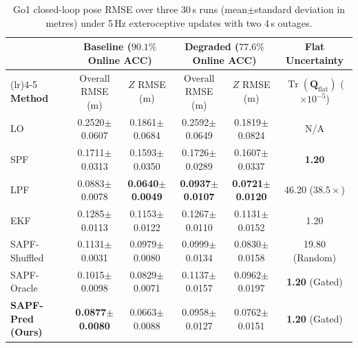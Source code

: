 \documentclass[11pt, a4paper]{article}
\begin{document}
\begin{table}[htbp]
    \centering
    \caption{Go1 closed-loop pose RMSE over three 30\,s runs (mean$\pm$standard deviation in metres) under 5\,Hz exteroceptive updates with two 4\,s outages.}
    \label{tab:go1_sapf}
    \footnotesize
    \setlength{\tabcolsep}{3.5pt}
    \begin{tabularx}{\textwidth}{>{\raggedright\arraybackslash}X ccccc}
        \toprule
        & \multicolumn{2}{c}{\textbf{Baseline ($90.1\%$ Online ACC)}} & \multicolumn{2}{c}{\textbf{Degraded ($77.6\%$ Online ACC)}} & \textbf{Flat Uncertainty} \\
        \cmidrule(lr){2-3}\cmidrule(lr){4-5}
        \textbf{Method} & Overall RMSE (m) & $Z$ RMSE (m) & Overall RMSE (m) & $Z$ RMSE (m) & $\operatorname{Tr}(\mathbf{Q}_{\text{flat}})$ ($\times 10^{-5}$) \\
        \midrule
        LO & 0.2520$\pm$0.0607 & 0.1861$\pm$0.0684 & 0.2592$\pm$0.0649 & 0.1819$\pm$0.0824 & N/A \\
        SPF & 0.1711$\pm$0.0313 & 0.1593$\pm$0.0350 & 0.1726$\pm$0.0289 & 0.1607$\pm$0.0337 & \textbf{1.20} \\
        LPF & 0.0883$\pm$0.0078 & \textbf{0.0640$\pm$0.0049} & \textbf{0.0937$\pm$0.0107} & \textbf{0.0721$\pm$0.0120} & 46.20 ($38.5\times$) \\
        EKF & 0.1285$\pm$0.0113 & 0.1153$\pm$0.0122 & 0.1267$\pm$0.0110 & 0.1131$\pm$0.0152 & 1.20 \\
        SAPF-Shuffled & 0.1131$\pm$0.0031 & 0.0979$\pm$0.0080 & 0.0999$\pm$0.0134 & 0.0830$\pm$0.0158 & 19.80 (Random) \\
        SAPF-Oracle & 0.1015$\pm$0.0098 & 0.0829$\pm$0.0071 & 0.1137$\pm$0.0157 & 0.0962$\pm$0.0197 & \textbf{1.20} (Gated) \\
        \textbf{SAPF-Pred (Ours)} & \textbf{0.0877$\pm$0.0080} & 0.0663$\pm$0.0088 & 0.0958$\pm$0.0127 & 0.0762$\pm$0.0151 & \textbf{1.20} (Gated) \\
        \bottomrule
    \end{tabularx}
\end{table}
\end{document}
